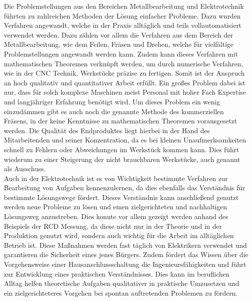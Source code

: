 Die Problemstellungen aus den Bereichen Metallbearbeitung und Elektrotechnik führten zu zahlreichen Methoden der Lösung einfacher Probleme. Dazu wurden 
Verfahren angewandt, welche in der Praxis alltäglich und teils vollautomatisiert verwendet werden. Dazu zählen vor allem die Verfahren aus dem Bereich 
der Metallbearbeitung, wie \zB dem Feilen, Fräsen und Drehen, welche für vielfältige Problemstellungen angewandt werden kann. Zudem kann dieses Verfahren
 mit mathematischen Theoremen verknüpft werden, um \zB durch numerische Verfahren, wie in der CNC Technik, Werkstücke präzise zu fertigen. Somit ist der 
 Anspruch an hoch qualitativ und quantitativer Arbeit erfüllt. Ein großes Problem dabei ist nur, dass für solch komplexe Maschinen meist Personal mit 
 hoher Fach Expertise und langjähriger Erfahrung benötigt wird. Um dieses Problem ein wenig einzudämmen gibt es auch noch die genannte Methode des 
 kommerziellen Fräsens, in der keine Kenntnisse zu mathematischen Theoremen vorausgesetzt werden. Die Qualität des Endproduktes liegt hierbei in der 
 Hand des Mitarbeitenden und seiner Konzentration, da es bei kleinen Unaufmerksamkeiten schnell zu Fehlern oder Abweichungen im Werkstück kommen kann. 
 Dies führt wiederum zu einer Steigerung der nicht brauchbaren Werkstücke, auch genannt als Ausschuss.\\
Auch in der Elektrotechnik ist es von Wichtigkeit bestimmte Verfahren zur Bearbeitung von Aufgaben kennenzulernen, da dies ebenfalls das Verständnis 
für bestimmte Lösungswege fördert. Dieses Verständnis kann anschließend genutzt werden neue Probleme zu lösen und einen zielgerichteten und nachhaltigen 
Lösungsweg anzustreben. Dies konnte vor allem gezeigt werden anhand des Beispiels der RCD Messung, da diese nicht nur in der Theorie und in der Produktion 
genutzt wird, sondern auch wichtig für die Arbeit im alltäglichen Betrieb ist. Diese Maßnahmen werden fast täglich von Elektrikern verwendet und 
garantieren die Sicherheit eines jenes Bürgers. Zudem fördert das Wissen über die Vorgehensweise einer Hausanschlussschaltung die Ingenieursfähigkeiten 
und führt zur Entwicklung eines praktischen Verständnisses. Dies kann im beruflichen Alltag helfen theoretische Aufgaben qualitativer in praktische 
Umzusetzen und ein zielgerichteteres Vorgehen bei spontan auftretenden Problemen zu fördern.


\clearpage